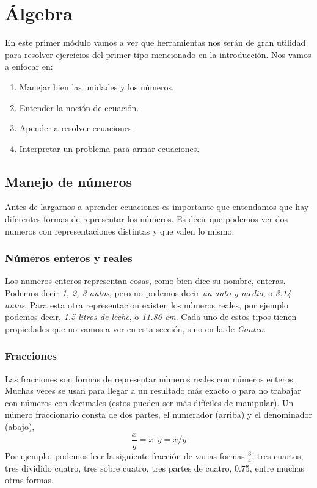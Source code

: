 \documentclass{article}
\begin{document}
\newpage

\section{Álgebra}
\begin{small}
En este primer módulo vamos a ver que herramientas nos serán de gran utilidad para resolver ejercicios del primer tipo mencionado en la introducción.
Nos vamos a enfocar en:
\begin{enumerate}
	\item Manejar bien las unidades y los números.
	\item Entender la noción de ecuación.
	\item Apender a resolver ecuaciones.
	\item Interpretar un problema para armar ecuaciones.
\end{enumerate}
\end{small}

\subsection{Manejo de números}
\begin{small}
Antes de largarnos a aprender ecuaciones es importante que entendamos que hay diferentes formas de representar los números. Es decir que podemos ver dos numeros con representaciones distintas y que valen lo mismo.
\end{small}

\subsubsection*{Números enteros y reales}
\begin{small}
Los numeros enteros representan cosas, como bien dice su nombre, enteras. Podemos decir \textit{1, 2, 3 autos}, pero no podemos decir \textit{un auto y medio}, o \textit{3.14 autos}. Para esta otra representacion existen los números reales, por ejemplo podemos decir, \textit{1.5 litros de leche}, o \textit{11.86 cm}.
Cada uno de estos tipos tienen propiedades que no vamos a ver en esta sección, sino en la de \textit{Conteo}.
\end{small}

\subsubsection*{Fracciones}
\begin{small}
Las fracciones son formas de representar números reales con números enteros. Muchas veces se usan para llegar a un resultado más exacto o para no trabajar con números con decimales (estos pueden ser más difíciles de manipular). Un número fraccionario consta de dos partes, el numerador (arriba) y el denominador (abajo),
\[\frac{x}{y}=x:y=x/y\]
Por ejemplo, podemos leer la siguiente fracción de varias formas $\frac{3}{4}$, tres cuartos, tres dividido cuatro, tres sobre cuatro, tres partes de cuatro, 0.75, entre muchas otras formas.
\\
\end{small}
\end{document}
